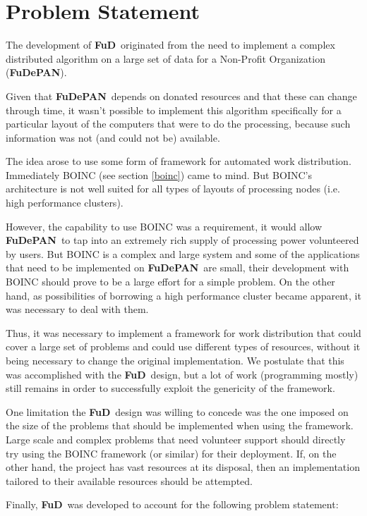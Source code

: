 \documentclass[a4paper,12pt,english]{report}
\newcommand{\fud}{\textbf{FuD}}
\newcommand{\fudepan}{\textbf{FuDePAN}}
\begin{document}
\section{Problem Statement}

The development of \fud \ originated from the need to implement a complex distributed algorithm on a large set of data for a Non-Profit Organization (\fudepan). 

Given that \fudepan \ depends on donated resources and that these can change through time, it wasn't possible to implement this algorithm specifically for a particular layout of the computers that were to do the processing, because such information was not (and could not be) available.

The idea arose to use some form of framework for automated work distribution. Immediately BOINC (see section \ref{boinc}) came to mind. But BOINC's architecture is not well suited for all types of layouts of processing nodes (i.e. high performance clusters).

However, the capability to use BOINC was a requirement, it would allow \fudepan \ to tap into an extremely rich supply of processing power volunteered by users\cite{boinc2}. But BOINC is a complex and large system and some of the applications that need to be implemented on \fudepan \ are small, their development with BOINC should prove to be a large effort for a simple problem. On the other hand, as possibilities of borrowing a high performance cluster became apparent, it was necessary to deal with them.

Thus, it was necessary to implement a framework for work distribution that could cover a large set of problems and could use different types of resources, without it being necessary to change the original implementation. We postulate that this was accomplished with the \fud \ design, but a lot of work (programming mostly) still remains in order to successfully exploit the genericity of the framework.

One limitation the \fud \ design was willing to concede was the one imposed on the size of the problems that should be implemented when using the framework. Large scale and complex problems that need volunteer support  should directly try using the BOINC framework (or similar) for their deployment. If, on the other hand, the project has vast resources at its disposal, then an implementation tailored to their available resources should be attempted.

Finally, \fud \ was developed to account for the following problem statement:
\end{document}
